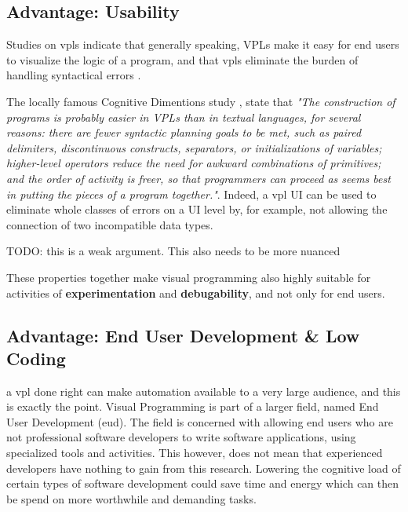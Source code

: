  

\subsection{Advantage: Usability}

Studies on \ac{vpl}s indicate that generally speaking, VPLs make it easy for end users to visualize the logic of a program, and that vpls eliminate the burden of handling syntactical errors \cite{kuhail_characterizing_2021}.

The locally famous Cognitive Dimentions study \cite{green_usability_1996}, state that \emph{"The construction of programs is probably easier in VPLs than in textual languages, for several reasons: 
there are fewer syntactic planning goals to be met, such as paired delimiters, discontinuous constructs, separators, or initializations of variables; 
higher-level operators reduce the need for awkward combinations of primitives; 
and the order of activity is freer, so that programmers can proceed as seems best in putting the pieces of a program together."}. 
Indeed, a vpl UI can be used to eliminate whole classes of errors on a UI level by, for example, not allowing the connection of two incompatible data types. 

\begin{note}
  TODO: this is a weak argument. This also needs to be more nuanced
\end{note}


These properties together make visual programming also highly suitable for activities of \textbf{experimentation} and \textbf{debugability}, and not only for end users. 


\subsection*{Advantage: End User Development \& Low Coding}
a \ac{vpl} done right can make automation available to a very large audience, and this is exactly the point. 
Visual Programming is part of a larger field, named End User Development (eud). 
The field is concerned with allowing end users who are not professional software developers to write software applications, using specialized tools and activities. 
This however, does not mean that experienced developers have nothing to gain from this research. 
Lowering the cognitive load of certain types of software development could save time and energy which can then be spend on more worthwhile and demanding tasks. 

